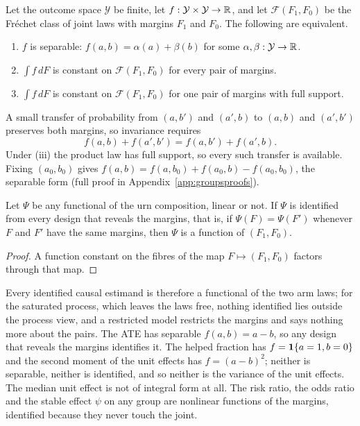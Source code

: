 \begin{theorem}[Separability]\label{gr:thm:sep}
Let the outcome space $\mathcal Y$ be finite, let $f:\mathcal Y\times\mathcal Y\to\mathbb{R}$, and let $\mathcal F(F_1,F_0)$ be the Fr\'echet class of joint laws with margins $F_1$ and $F_0$. The following are equivalent.
\begin{enumerate}
\item[(i)] $f$ is separable: $f(a,b)=\alpha(a)+\beta(b)$ for some $\alpha,\beta:\mathcal Y\to\mathbb{R}$.
\item[(ii)] $\int f\,dF$ is constant on $\mathcal F(F_1,F_0)$ for every pair of margins.
\item[(iii)] $\int f\,dF$ is constant on $\mathcal F(F_1,F_0)$ for one pair of margins with full support.
\end{enumerate}
\end{theorem}

A small transfer of probability from $(a,b')$ and $(a',b)$ to $(a,b)$ and $(a',b')$ preserves both margins, so invariance requires
\[
f(a,b)+f(a',b')=f(a,b')+f(a',b).
\]
Under (iii) the product law has full support, so every such transfer is available. Fixing $(a_0,b_0)$ gives $f(a,b)=f(a,b_0)+f(a_0,b)-f(a_0,b_0)$, the separable form (full proof in Appendix~\ref{app:groupsproofs}).

\begin{corollary}\label{gr:cor:complete}
Let $\Psi$ be any functional of the urn composition, linear or not. If $\Psi$ is identified from every design that reveals the margins, that is, if $\Psi(F)=\Psi(F')$ whenever $F$ and $F'$ have the same margins, then $\Psi$ is a function of $(F_1,F_0)$.
\end{corollary}

\begin{proof}
A function constant on the fibres of the map $F\mapsto(F_1,F_0)$ factors through that map.
\end{proof}

Every identified causal estimand is therefore a functional of the two arm laws; for the saturated process, which leaves the laws free, nothing identified lies outside the process view, and a restricted model restricts the margins and says nothing more about the pairs. The ATE has separable $f(a,b)=a-b$, so any design that reveals the margins identifies it. The helped fraction has $f=\mathbf{1}\{a=1,b=0\}$ and the second moment of the unit effects has $f=(a-b)^2$; neither is separable, neither is identified, and so neither is the variance of the unit effects. The median unit effect is not of integral form at all. The risk ratio, the odds ratio and the stable effect $\psi$ on any group are nonlinear functions of the margins, identified because they never touch the joint.

